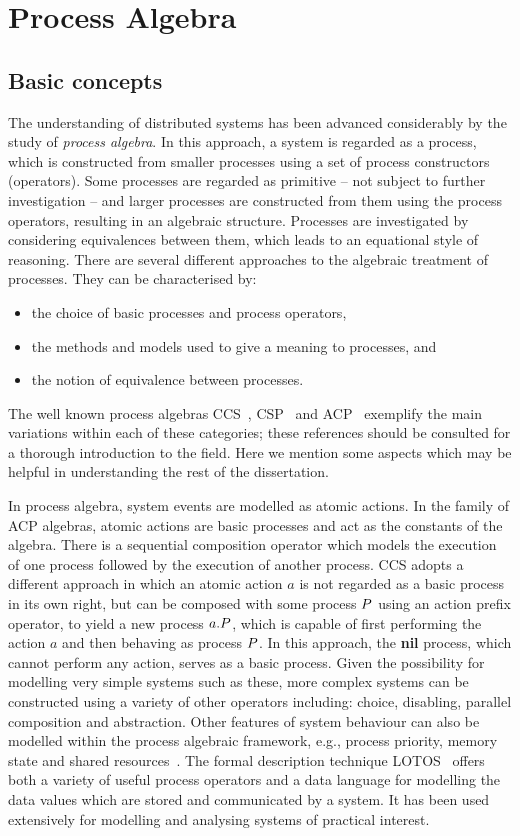 {\section{Process Algebra}\label{sec:msctpa}
\subsection{Basic concepts}
The understanding of distributed systems has been advanced
considerably by the study of \emph{process algebra}. In this approach,
a system is regarded as a process, which is constructed from smaller
processes using a set of process constructors (operators).  Some
processes are regarded as primitive -- not subject to further
investigation -- and larger processes are constructed from them using
the process operators, resulting in an algebraic structure.  Processes
are investigated by considering equivalences between them, which leads to
an equational style of reasoning. There are several different
approaches to the algebraic treatment of processes. They can be
characterised by:
\begin{itemize}
\item the choice of basic processes and process operators,
\item the methods and models used to give a meaning to processes, and
\item the notion of equivalence between processes.  
\end{itemize}
The well known process algebras CCS~\cite{mil:89}, CSP~\cite{hoa:85}
and ACP~\cite{bw:90} exemplify the main variations within each of
these categories; these references should be consulted for a thorough
introduction to the field. Here we mention some aspects which may be
helpful in understanding the rest of the dissertation.

In process algebra, system events are modelled as atomic actions. In
the family of ACP algebras, atomic actions are basic processes and act
as the constants of the algebra. There is a sequential composition
operator which models the execution of one process followed by the
execution of another process. CCS adopts a different approach in which
an atomic action $a$ is not regarded as a basic process in its own
right, but can be composed with some process $\P$ using an action
prefix operator, to yield a new process $a.\P$, which is capable of
first performing the action $a$ and then behaving as process $\P$. In
this approach, the \textbf{nil} process, which cannot perform any action,
serves as a basic process. Given the possibility for modelling very
simple systems such as these, more complex systems can be constructed
using a variety of other operators including: choice, disabling,
parallel composition and abstraction. Other features of system
behaviour can also be modelled within the process algebraic framework,
e.g., process priority, memory state and shared
resources~\cite{bv:95,lbg:94}. The formal description technique
LOTOS~\cite{lot:88} offers both a variety of useful process operators
and a data language for modelling the data values which are stored and
communicated by a system. It has been used extensively for modelling
and analysing systems of practical interest.

}
